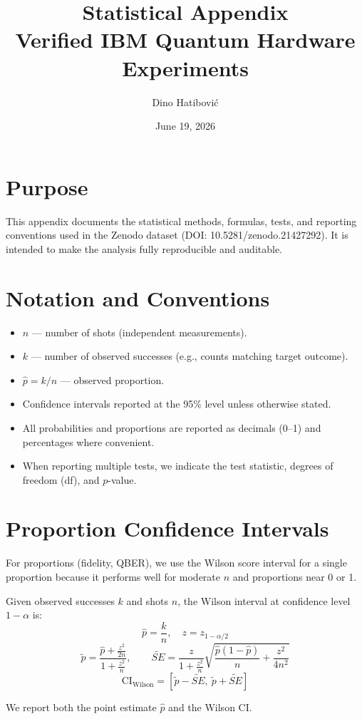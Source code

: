 \documentclass[11pt]{article}
\title{Statistical Appendix\\Verified IBM Quantum Hardware Experiments}
\author{Dino Hatibović}
\date{June 19, 2026}
\begin{document}
\maketitle

\section*{Purpose}
This appendix documents the statistical methods, formulas, tests, and reporting conventions used in the Zenodo dataset (DOI: 10.5281/zenodo.21427292). It is intended to make the analysis fully reproducible and auditable.

\section{Notation and Conventions}
\begin{itemize}
  \item $n$ — number of shots (independent measurements).
  \item $k$ — number of observed successes (e.g., counts matching target outcome).
  \item $\hat{p}=k/n$ — observed proportion.
  \item Confidence intervals reported at the 95\% level unless otherwise stated.
  \item All probabilities and proportions are reported as decimals (0--1) and percentages where convenient.
  \item When reporting multiple tests, we indicate the test statistic, degrees of freedom (df), and $p$-value.
\end{itemize}

\section{Proportion Confidence Intervals}
For proportions (fidelity, QBER), we use the Wilson score interval for a single proportion because it performs well for moderate $n$ and proportions near 0 or 1.

Given observed successes $k$ and shots $n$, the Wilson interval at confidence level $1-\alpha$ is:
\[
\hat{p} = \frac{k}{n},\quad
z = z_{1-\alpha/2}
\]
\[
\tilde{p} = \frac{\hat{p} + \frac{z^2}{2n}}{1 + \frac{z^2}{n}},\qquad
\tilde{SE} = \frac{z}{1 + \frac{z^2}{n}}\sqrt{\frac{\hat{p}(1-\hat{p})}{n} + \frac{z^2}{4n^2}}
\]
\[
\text{CI}_{\text{Wilson}} = \left[\tilde{p} - \tilde{SE},\ \tilde{p} + \tilde{SE}\right]
\]

We report both the point estimate $\hat{p}$ and the Wilson CI.
\end{document}
